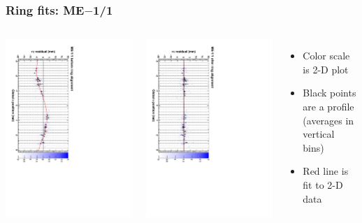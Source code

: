 \documentclass[compress]{beamer}
\begin{document}
\begin{frame}
\frametitle{Ring fits: ME$-$1/1}
\vfill
\begin{columns}
\includegraphics[height=\linewidth, angle=90]{ringfits_before/mem11.pdf}

\includegraphics[height=\linewidth, angle=90]{ringfits_after/mem11.pdf}
\begin{itemize}
\item Color scale is 2-D plot
\item Black points are a profile (averages in vertical bins)
\item Red line is fit to 2-D data
\end{itemize}
\end{columns}
\end{frame}
\end{document}
